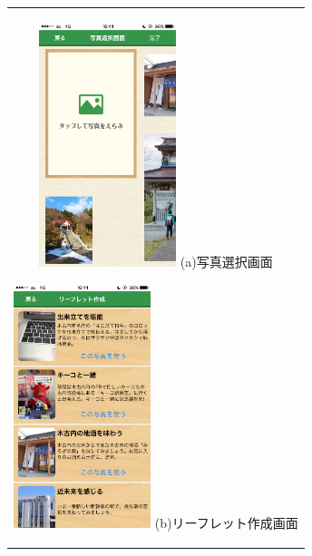 \begin{figure}[htbp]
  \begin{center}
    \begin{tabular}{c}

      \begin{minipage}{0.33\hsize}
        \begin{center}
\includegraphics[width=4cm, bb=0 0 304 570]{kiko_print2.PNG}
          \hspace{1cm} (a)写真選択画面
        \end{center}
      \end{minipage}

      \begin{minipage}{0.33\hsize}
        \begin{center}
\includegraphics[width=4cm, bb=0 0 304 570]{kiko_print3.PNG}
          \hspace{1cm} (b)リーフレット作成画面
        \end{center}
      \end{minipage}
      
      \\
      

\end{tabular}
\end{center}
\end{figure}
